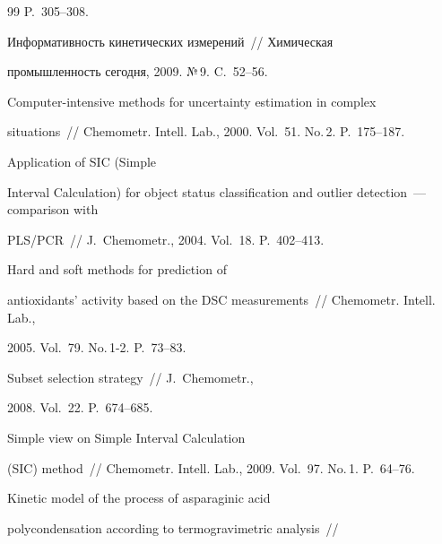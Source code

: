 {{\begin{thebibliography}{99}
P.~305--308.


 Информативность кинетических измерений~/\!\!/ Химическая 

промышленность сегодня, 2009. №\,9. C.~52--56.




 Computer-intensive methods for uncertainty estimation in complex 

situations~/\!\!/ Chemometr. Intell. Lab., 2000. Vol.~51. No.\,2. P.~175--187.




 Application of SIC (Simple 

Interval Calculation) for object status classification and outlier detection~--- comparison with 

PLS/PCR~/\!\!/ J.~Chemometr., 2004. Vol.~18. P.~402--413. 


 Hard and soft methods for prediction of 

antioxidants' activity based on the DSC measurements~/\!\!/ Chemometr. Intell. Lab., 

2005. Vol.~79. No.\,1-2. P.~73--83.


 Subset selection strategy~/\!\!/ J.~Chemometr., 

2008. Vol.~22. P.~674--685.


 Simple view on Simple Interval Calculation 

(SIC) method~/\!\!/ Chemometr. Intell. Lab., 2009. Vol.~97. No.\,1. P.~64--76.






Kinetic model of the process of asparaginic acid 

polycondensation according to termogravimetric analysis~/\!\!/ 


\end{thebibliography}}}
